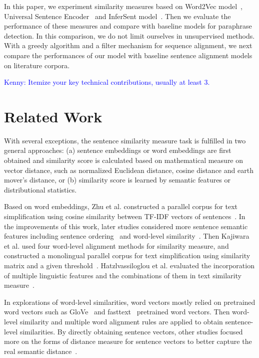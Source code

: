 \documentclass[runningheads]{llncs}
\newcommand{\KZ}[1]{\textcolor{blue}{Kenny: #1}}
\begin{document}
In this paper, we experiment similarity measures based on Word2Vec model~\cite{mikolov2013distributed}, Universal Sentence Encoder~\cite{cer2018universal} and InferSent model~\cite{conneau2017supervised}. Then we evaluate the performance of these measures and compare with baseline models for paraphrase detection. In this comparison, we do not limit ourselves in unsupervised methods. With a greedy algorithm and a filter mechanism for sequence alignment, we next compare the performances of our model with baseline sentence alignment models on literature corpora.

\KZ{Itemize your key technical contributions, usually at least 3.}

\section{Related Work}
\label{sec:related}

With several exceptions, the sentence similarity measure task is fulfilled in two general approaches: (a) sentence embeddings or word embeddings are first obtained and similarity score is calculated based on mathematical measure on vector distance, such as normalized Euclidean distance, cosine distance and earth mover's distance, or (b) similarity score is learned by semantic features or distributional statistics.

Based on word embeddings, Zhu et al. constructed a parallel corpus for text simplification using cosine similarity between TF-IDF vectors of sentences~\cite{zhu2010monolingual}. In the improvements of this work, later studies considered more sentence semantic features including sentence ordering~\cite{coster2011learning} and word-level similarity~\cite{hwang2015aligning}. Then Kajiwara et al. used four word-level alignment methods for similarity measure, and constructed a monolingual parallel corpus for text simplification using similarity matrix and a given threshold~\cite{kajiwara2016building}. Hatzlvassiloglou et al. evaluated the incorporation of multiple linguistic features and the combinations of them in text similarity measure~\cite{hatzlvassiloglou1999detecting}.

In explorations of word-level similarities, word vectors mostly relied on pretrained word vectors such as GloVe~\cite{pennington2014glove} and fasttext~\cite{joulin2017bag} pretrained word vectors. Then word-level similarity and multiple word alignment rules are applied to obtain sentence-level similarities. By directly obtaining sentence vectors, other studies focused more on the forms of distance measure for sentence vectors to better capture the real semantic distance~\cite{kajiwara2016building}.
\end{document}
